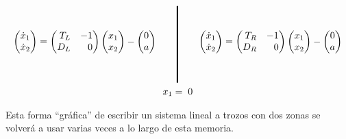 \documentclass[12pt,a4paper]{report} %
\begin{document}
	\begin{equation}
		\label{eq:lienardfinalgr}
		\begin{gathered}
			\begin{pmatrix*}[r]
				\dot{x}_1\\ \dot{x}_2
			\end{pmatrix*}= \begin{pmatrix*}[r]
				T_L & -1 \\ D_L & 0
			\end{pmatrix*} \begin{pmatrix*}[r]
				x_1 \\ x_2
			\end{pmatrix*}-\begin{pmatrix*}[c]
				0 \\ a
			\end{pmatrix*} \qquad 
			\rule[-40pt]{1.5pt}{80pt} \qquad 
			\begin{pmatrix*}[r]
				\dot{x}_1\\ \dot{x}_2
			\end{pmatrix*}= \begin{pmatrix*}[r]
				T_R & -1 \\ D_R & 0
			\end{pmatrix*} \begin{pmatrix*}[r]
				x_1 \\ x_2
			\end{pmatrix*}-\begin{pmatrix*}[c]
				0 \\ a
			\end{pmatrix*} \\ x_1=\;0
		\end{gathered}
	\end{equation}\smallskip
	
	\vspace{0.5cm}\noindent Esta forma ``gráfica'' de escribir un sistema lineal a trozos con dos zonas se volverá a usar varias veces a lo largo de esta memoria.
	
\end{document}
